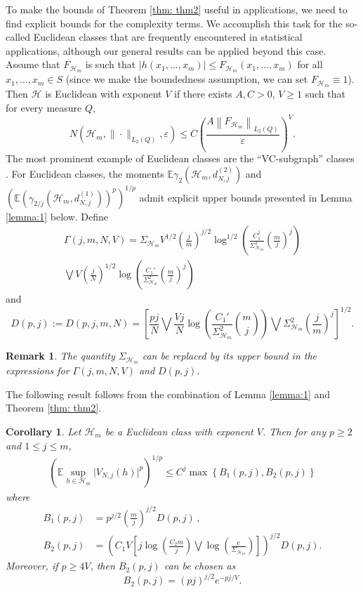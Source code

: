 \documentclass[12pt]{article}
\newcommand{\eps}{\varepsilon}
\newcommand{\ben}[1]{\begin{equation}#1\end{equation}}
\def\l{\left}
\def\r{\right}
\newcommand{\m}{\mathcal}
\newcommand{\mb}{\mathbb}
\theoremstyle{thmstyletwo}%
\newtheorem{remark}{Remark}%
\newtheorem{corollary}{Corollary}
\theoremstyle{thmstylethree}%
\begin{document}
To make the bounds of Theorem \ref{thm: thm2} useful in applications, we need to find explicit bounds for the complexity terms. We accomplish this task for the so-called Euclidean classes \citep{nolan1987u} that are frequently encountered in statistical applications, although our general results can be applied beyond this case. Assume that $F_{\m H_m}$ is such that $|h(x_1,\ldots,x_m)|\leq F_{\m H_m}(x_1,\ldots,x_m)$ for all $x_1,\ldots,x_m\in S$ (since we make the boundedness assumption, we can set $F_{\m H_m}\equiv 1$). Then $\m H$ is Euclidean with exponent $V$ if there exists $A,C>0$, $V\geq 1$ such that for every measure $Q$, 
\ben{
\label{eq:euclidean}
N\l(\m H_m,\|\cdot\|_{L_2(Q)},\eps\r)\leq C\l( \frac{A\l\| F_{\m H_m} \r\|_{L_2(Q)}}{\eps}\r)^V.
}
The most prominent example of Euclidean classes are the ``VC-subgraph'' classes \citep[see Theorem 2.6.7 in][]{wellner2013weak}. For Euclidean classes, the moments $\mb E \gamma_{2} \l(\mathcal{H}_m, d^{(2)}_{N,j}\r)$ and $ \l(\mb E \l(\gamma_{2/j} (\mathcal{H}_m, d^{(1)}_{N,j}) \r)^p\r)^{1/p}$ admit explicit upper bounds presented in Lemma \ref{lemma:1} below. Define 
\begin{multline}
\label{eq:gamma}
 \Gamma(j,m,N,V) =  \Sigma_{\m H_m} V^{1/2}\l(\frac{j}{m}\r)^{j/2} \log^{1/2} \l(\frac{C_1^j}{\Sigma_{\m H_m}^2}\l(\frac{m}{j}\r)^j\r)
 \\
 \bigvee  V\l(\frac{j}{N}\r)^{1/2} \log\l(\frac{C_1'}{\Sigma_{\m H_m}^2}\l(\frac{m}{j}\r)^j\r)
\end{multline}
and 
\ben{
\label{eq:D(p,j)}
D(p,j):=D(p,j,m,N) = \l[\frac{pj}{N}\bigvee \frac{Vj}{N}\log\l(\frac{C_1'}{\Sigma_{\m H_m}^2}{m \choose j}\r)\bigvee \Sigma^2_{\m H_m}\l(\frac{j}{m}\r)^{j} \r]^{1/2}.
}
\begin{remark}
    The quantity $\Sigma_{\m H_m}$ can be replaced by its upper bound in the expressions for $\Gamma(j,m,N,V)$ and $D(p,j)$. 
\end{remark}
\noindent The following result follows from the combination of Lemma \ref{lemma:1} and Theorem \ref{thm: thm2}. 
\begin{corollary}
\label{corollary:1}
Let $\m H_m$ be a Euclidean class with exponent $V$. Then for any $p \geq 2$ and $1 \leq j \leq m$,   
    \begin{align*}
    \l(\mb E \sup_{h \in \mathcal{H}_m} \lvert V_{N,j}(h) \rvert^p \r)^{1/p}  \leq C^j\max\l\{B_1(p,j), B_2(p,j)\r\} 
\end{align*}
where 
    \begin{align*}
    B_1(p,j) &= p^{j/2}\l(\frac{m}{j}\r)^{j/2} D(p,j)\,,
    \\
    B_2(p,j) &= 
    \l(C_1V \l[j\log\l(\frac{C_2m}{j}\r) \bigvee \log\l( \frac{e}{\Sigma_{\m H_m}}\r)\r]\r)^{j/2} D(p,j).
    \end{align*}
    Moreover, if $p\geq 4V$, then $B_2(p,j)$ can be chosen as
    \[
    B_2(p,j) = ( pj)^{j/2} e^{-pj/V}.
    \]
\end{corollary}
\end{document}

